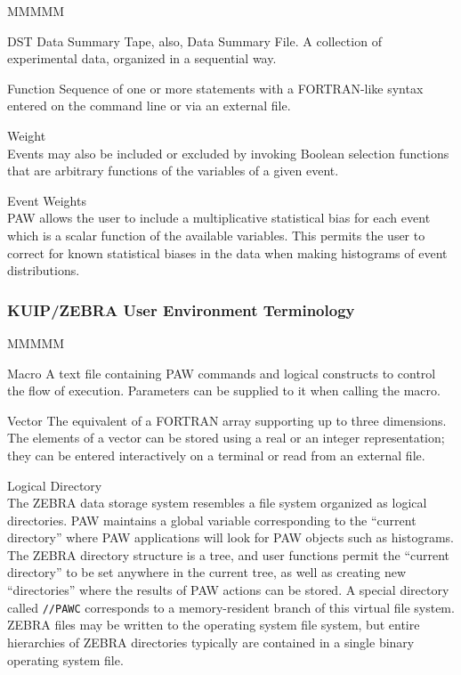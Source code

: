 \begin{DL}{MMMMM}
\item[DST]       Data Summary Tape, also, Data Summary File. 
                 A collection of experimental data,
                 organized in a sequential way.
\item[Function]  Sequence of one or more statements with a FORTRAN-like syntax
                 entered on the command line or via an external file.
\item[Weight]\mbox{}\\
      Events may also
     be included or excluded  by invoking Boolean selection functions
     that are arbitrary functions of the variables of a given event.
\item[Event Weights] \mbox{}\\
     PAW allows the user to include a
     multiplicative statistical bias for each event which is a scalar
     function of the available variables.  This permits the user to
     correct for known statistical biases in the data when making
     histograms of event distributions.
\end{DL}

\subsubsection*{KUIP/ZEBRA User Environment Terminology}

\begin{DL}{MMMMM}
\item[Macro]     A text file containing PAW commands 
                 and logical constructs to control the flow of execution. 
                 Parameters can be supplied to it when calling the macro.
\item[Vector]    The equivalent of a FORTRAN array supporting 
                 up to three dimensions.
                 The elements of a vector can be stored using a real or an
                 integer representation;
                 they can be entered interactively on a terminal or read
                 from an external file.
\item[Logical Directory]\mbox{}\\
     The ZEBRA data storage system resembles a file system organized
     as logical directories.  PAW maintains
     a global variable corresponding to the ``current directory'' where
     PAW applications will look for PAW objects such as histograms.
     The ZEBRA directory structure is a tree, and user functions permit
     the ``current directory'' to be set anywhere in the current tree,
     as well as creating new ``directories'' where the results
     of PAW actions can be stored.  A special
     directory called {\tt //PAWC} corresponds to a memory-resident
     branch of this virtual file system.  ZEBRA files may be written
     to the operating system file system, but entire hierarchies of
     ZEBRA directories typically are contained in a single binary operating
     system file.
\end{DL}


